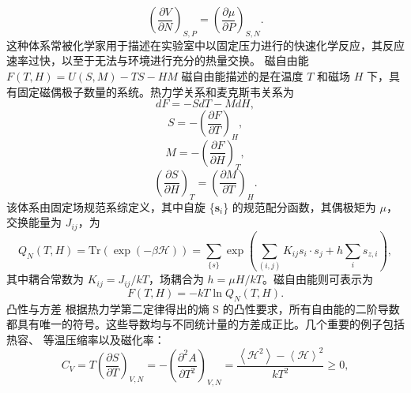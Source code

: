 \begin{equation}\tag{17.11.40}\label{eq:17.11.40}
\left( \frac { \partial V } { \partial N } \right) _ { S , P } = \left( \frac { \partial \mu } { \partial P } \right) _ { S , N } .
\end{equation}
这种体系常被化学家用于描述在实验室中以固定压力进行的快速化学反应，其反应速率过快，以至于无法与环境进行充分的热量交换。
磁自由能 \(F(T,H)=U(S,M)-TS-HM\)
磁自由能描述的是在温度 \(T\) 和磁场 \(H\) 下，具有固定磁偶极子数量的系统。热力学关系和麦克斯韦关系为
\begin{equation}\tag{17.11.41}\label{eq:17.11.41}
d F = - S d T - M d H ,
\end{equation}
\begin{equation}\tag{17.11.42}\label{eq:17.11.42}
S = - \left( { \frac { \partial F } { \partial T } } \right) _ { H } ,
\end{equation}
\begin{equation}\tag{17.11.43}\label{eq:17.11.43}
M = - \left( \frac { \partial F } { \partial H } \right) _ { T } ,
\end{equation}
\begin{equation}\tag{17.11.44}\label{eq:17.11.44}
\left( { \frac { \partial S } { \partial H } } \right) _ { T } = \left( { \frac { \partial M } { \partial T } } \right) _ { H } .
\end{equation}
该体系由固定场规范系综定义，其中自旋 \{\(\mathbf{s}_i\)\} 的规范配分函数，其偶极矩为 \(\mu\)，交换能量为 \(J_{ij}\)，为
\begin{equation}\tag{17.11.45}\label{eq:17.11.45}
Q _ { N } ( T , H ) = \mathrm { T r } \left( \exp ( - \beta \mathcal { H } ) \right) = \sum _ { \{ s \} } \exp \left( \sum _ { ( i , j ) } K _ { i j } s _ { i } \cdot s _ { j } + h \sum _ { i } s _ { z , i } \right) ,
\end{equation}
其中耦合常数为 \(K_{ij}=J_{ij}/kT\)，场耦合为 \(h=\mu H/kT\)。磁自由能则可表示为
\begin{equation}\tag{17.11.46}\label{eq:17.11.46}
F ( T , H ) = - k T \ln Q _ { N } ( T , H ) .
\end{equation}
凸性与方差
根据热力学第二定律得出的熵 S 的凸性要求，所有自由能的二阶导数都具有唯一的符号。这些导数均与不同统计量的方差成正比。几个重要的例子包括热容、
等温压缩率以及磁化率：
\begin{equation}\tag{17.11.47}\label{eq:17.11.47}
C _ { V } = T \left( \frac { \partial S } { \partial T } \right) _ { V , N } = - \left( \frac { \partial ^{2} A } { \partial T ^{2} } \right) _ { V , N } = \frac { \left\langle \mathcal { H } ^{2} \right\rangle - \left\langle \mathcal { H } \right\rangle ^{2} } { k T ^{2} } \geq 0 ,
\end{equation}
